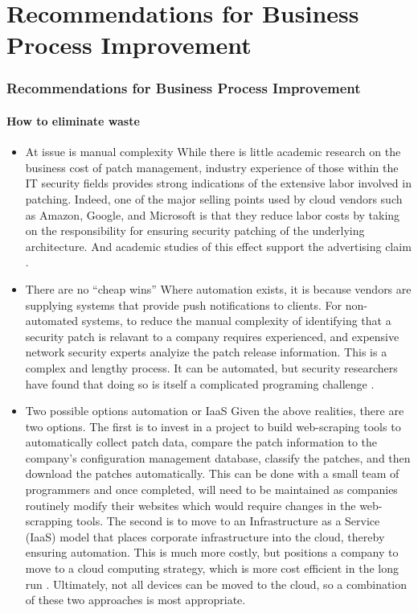 \section{Recommendations for Business Process Improvement}
\begin{frame}
  \frametitle{Recommendations for Business Process Improvement}
  \framesubtitle{How to eliminate waste}
  \begin{itemize}
    \item<1-> At issue is manual complexity
       {\scriptsize{While there is little academic research on the business cost of patch management, industry experience of those within the IT security fields provides strong indications of the extensive labor involved in patching. Indeed, one of the major selling points used by cloud vendors such as Amazon, Google, and Microsoft is that they reduce labor costs by taking on the responsibility for ensuring security patching of the underlying architecture. And academic studies of this effect support the advertising claim \parencite {devarakondaLaborCostReduction2013}.}}

    \item<2-> There are no ``cheap wins''
       {\scriptsize{Where automation exists, it is because vendors are supplying systems that provide push notifications to clients. For non-automated systems, to reduce the manual complexity of identifying that a security patch is relavant to a company requires experienced, and expensive network security experts analyize the patch release information. This is a complex and lengthy process. It can be automated, but security researchers have found that doing so is itself a complicated programing challenge \parencite{liLargeScaleEmpiricalStudy2017}.}}

    \item<3-> Two possible options automation or IaaS
       {\scriptsize{Given the above realities, there are two options. The first is to invest in a project to build web-scraping tools to automatically collect patch data, compare the patch information to the company's configuration management database, classify the patches, and then download the patches automatically. This can be done with a small team of programmers and once completed, will need to be maintained as companies routinely modify their websites which would require changes in the web-scrapping tools. The second is to move to an Infrastructure as a Service (IaaS) model that places corporate infrastructure into the cloud, thereby ensuring automation. This is much more costly, but positions a company to move to a cloud computing strategy, which is more cost efficient in the long run \parencite{linCloudComputingInnovation2012}. Ultimately, not all devices can be moved to the cloud, so a combination of these two approaches is most appropriate. }}



  \end{itemize}
\end{frame}
